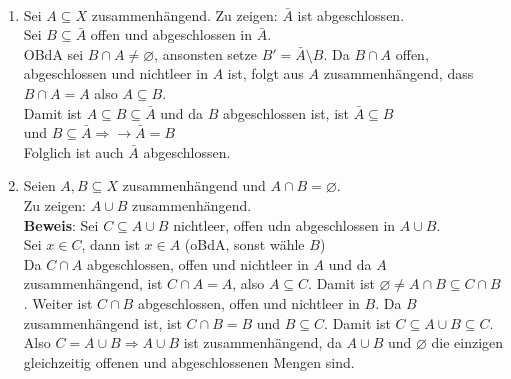 \begin{solution}
  \
  \begin{enumerate}[label= (\alph*)]
    \item Sei \( A \subseteq X \) zusammenhängend. Zu zeigen: \( \bar{A} \) ist abgeschlossen. \\ 
    Sei \( B \subseteq \bar{A} \) offen und abgeschlossen in \( \bar{A} \). \\
    OBdA sei \( B \cap A \neq \varnothing \), ansonsten setze \( B' = \bar{A} \setminus B \).
    Da \( B \cap A \) offen, abgeschlossen und nichtleer in \( A \) ist, folgt aus \( A \) zusammenhängend, dass 
    \( B \cap A = A \) also \( A \subseteq B \). \\
    Damit ist \( A \subseteq B \subseteq \bar{A} \) und da \( B \) abgeschlossen ist, ist \( \bar{A} \subseteq B \) \\
    und \( B \subseteq \bar{A} \Rightarrow \rightarrow \bar{A} = B \) \\
    Folglich ist auch \( \bar{A} \) abgeschlossen.
    
    \item Seien \( A,B \subseteq X \) zusammenhängend und \( A \cap B = \varnothing \). \\
    Zu zeigen: \( A \cup B \) zusammenhängend. \\
    \textbf{Beweis}: Sei \( C \subseteq A \cup B \) nichtleer, offen udn abgeschlossen in \( A \cup B \). \\
    Sei \( x \in C \), dann ist \( x \in A \) (oBdA, sonst wähle \( B \))\\
    Da \( C \cap A \) abgeschlossen, offen und nichtleer in \( A \) und da \( A \) zusammenhängend, ist \( C \cap A = A \), also \( A \subseteq C \). Damit ist \( \varnothing \neq A \cap B \subseteq C \cap B \). Weiter ist \( C \cap B \) abgeschlossen, offen und nichtleer in \( B \). Da \( B \) zusammenhängend ist, ist \( C \cap B = B \) und \( B \subseteq C \). Damit ist \( C \subseteq A \cup B \subseteq C \). \\
    Also \( C = A \cup B \Rightarrow A \cup B \) ist zusammenhängend, da \( A \cup B \) und \( \varnothing \) die einzigen gleichzeitig offenen und abgeschlossenen Mengen sind. 
    

\end{enumerate}
\end{solution}
